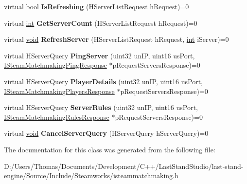 \begin{DoxyCompactItemize}
\item 
\hypertarget{classISteamMatchmakingServers_ab0c2205cb04530db8a0ae6b4a81280b6}{}virtual bool {\bfseries Is\+Refreshing} (H\+Server\+List\+Request h\+Request)=0\label{classISteamMatchmakingServers_ab0c2205cb04530db8a0ae6b4a81280b6}

\item 
\hypertarget{classISteamMatchmakingServers_a655af6286a9ea8a974f48075c8b61d83}{}virtual \hyperlink{SDL__thread_8h_a6a64f9be4433e4de6e2f2f548cf3c08e}{int} {\bfseries Get\+Server\+Count} (H\+Server\+List\+Request h\+Request)=0\label{classISteamMatchmakingServers_a655af6286a9ea8a974f48075c8b61d83}

\item 
\hypertarget{classISteamMatchmakingServers_aedfd23a77ec6f8e6065270f24adb7dae}{}virtual \hyperlink{SDL__audio_8h_a52835ae37c4bb905b903cbaf5d04b05f}{void} {\bfseries Refresh\+Server} (H\+Server\+List\+Request h\+Request, \hyperlink{SDL__thread_8h_a6a64f9be4433e4de6e2f2f548cf3c08e}{int} i\+Server)=0\label{classISteamMatchmakingServers_aedfd23a77ec6f8e6065270f24adb7dae}

\item 
\hypertarget{classISteamMatchmakingServers_a9e87fc564e34c0c45b7a19394c773ec4}{}virtual H\+Server\+Query {\bfseries Ping\+Server} (uint32 un\+I\+P, uint16 us\+Port, \hyperlink{classISteamMatchmakingPingResponse}{I\+Steam\+Matchmaking\+Ping\+Response} $\ast$p\+Request\+Servers\+Response)=0\label{classISteamMatchmakingServers_a9e87fc564e34c0c45b7a19394c773ec4}

\item 
\hypertarget{classISteamMatchmakingServers_aa33a87b4bb1d3d156ba6b43a673ee61c}{}virtual H\+Server\+Query {\bfseries Player\+Details} (uint32 un\+I\+P, uint16 us\+Port, \hyperlink{classISteamMatchmakingPlayersResponse}{I\+Steam\+Matchmaking\+Players\+Response} $\ast$p\+Request\+Servers\+Response)=0\label{classISteamMatchmakingServers_aa33a87b4bb1d3d156ba6b43a673ee61c}

\item 
\hypertarget{classISteamMatchmakingServers_aa0aaf1641ec9946412ef006b98852397}{}virtual H\+Server\+Query {\bfseries Server\+Rules} (uint32 un\+I\+P, uint16 us\+Port, \hyperlink{classISteamMatchmakingRulesResponse}{I\+Steam\+Matchmaking\+Rules\+Response} $\ast$p\+Request\+Servers\+Response)=0\label{classISteamMatchmakingServers_aa0aaf1641ec9946412ef006b98852397}

\item 
\hypertarget{classISteamMatchmakingServers_aad4251435d7a4550ef3d4ac389645e8a}{}virtual \hyperlink{SDL__audio_8h_a52835ae37c4bb905b903cbaf5d04b05f}{void} {\bfseries Cancel\+Server\+Query} (H\+Server\+Query h\+Server\+Query)=0\label{classISteamMatchmakingServers_aad4251435d7a4550ef3d4ac389645e8a}

\end{DoxyCompactItemize}


The documentation for this class was generated from the following file\+:\begin{DoxyCompactItemize}
\item 
D\+:/\+Users/\+Thomas/\+Documents/\+Development/\+C++/\+Last\+Stand\+Studio/last-\/stand-\/engine/\+Source/\+Include/\+Steamworks/isteammatchmaking.\+h\end{DoxyCompactItemize}

